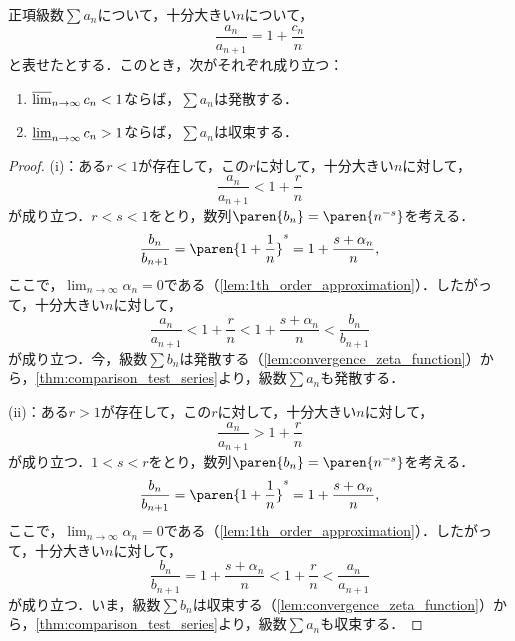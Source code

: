 \documentclass[a4paper,10pt]{ltjsarticle}
\begin{document}
\begin{MyTheorem}
  正項級数\(\sum a_n\)について，十分大きい\(n\)について，
  \[ \frac{a_n}{a_{n+1}} = 1 + \frac{c_n}{n} \]
  と表せたとする．このとき，次がそれぞれ成り立つ：
  \begin{enumerate}
    \item \(\varlimsup_{n\to\infty}c_n < 1\)ならば，\(\sum a_n\)は発散する．
    \item \(\varliminf_{n\to\infty}c_n > 1\)ならば，\(\sum a_n\)は収束する．
  \end{enumerate}
\end{MyTheorem}
\begin{proof}
  (i)：ある\(r < 1\)が存在して，この\(r\)に対して，十分大きい\(n\)に対して，
  \[ \frac{a_n}{a_{n+1}} < 1 + \frac{r}{n} \]
  が成り立つ．\(r < s < 1\)をとり，数列\(\paren{b_n} = \paren{n^{-s}}\)を考える．
  \[ \frac{b_n}{b_{n+1}} = \paren{1 + \frac1n}^s = 1 + \frac {s + \alpha_n}{n}, \]
  ここで，\(\lim_{n\to\infty}\alpha_n = 0\)である（\cref{lem:1th_order_approximation}）．したがって，十分大きい\(n\)に対して，
  \[ \frac{a_n}{a_{n+1}} < 1 + \frac rn < 1 + \frac{s + \alpha_n}n < \frac{b_n}{b_{n+1}} \]
  が成り立つ．今，級数\(\sum b_n\)は発散する（\cref{lem:convergence_zeta_function}）から，\cref{thm:comparison_test_series}より，級数\(\sum a_n\)も発散する．

  (ii)：ある\(r > 1\)が存在して，この\(r\)に対して，十分大きい\(n\)に対して，
  \[ \frac{a_n}{a_{n+1}} > 1 + \frac{r}{n} \]
  が成り立つ．\(1 < s < r\)をとり，数列\(\paren{b_n} = \paren{n^{-s}}\)を考える．
  \[ \frac{b_n}{b_{n+1}} = \paren{1 + \frac1n}^s = 1 + \frac {s + \alpha_n}{n}, \]
  ここで，\(\lim_{n\to\infty}\alpha_n = 0\)である（\cref{lem:1th_order_approximation}）．したがって，十分大きい\(n\)に対して，
  \[ \frac{b_n}{b_{n+1}} = 1 + \frac{s + \alpha_n}{n} < 1 + \frac rn < \frac{a_n}{a_{n+1}} \]
  が成り立つ．いま，級数\(\sum b_n\)は収束する（\cref{lem:convergence_zeta_function}）から，\cref{thm:comparison_test_series}より，級数\(\sum a_n\)も収束する．
\end{proof}
\end{document}
